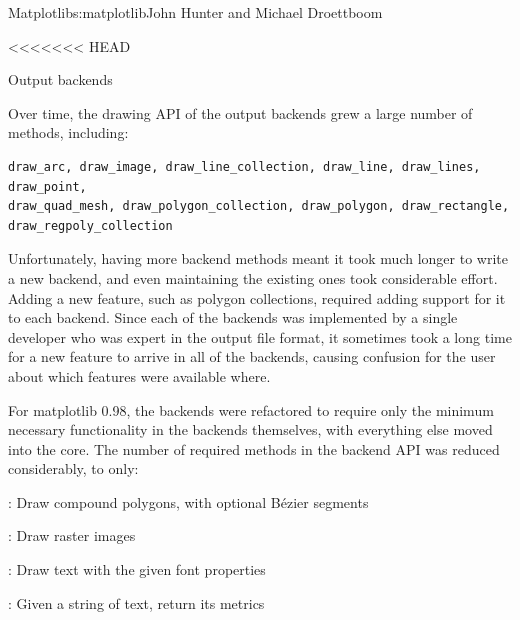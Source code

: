 \begin{aosachapter}{Matplotlib}{s:matplotlib}{John Hunter and Michael Droettboom}


<<<<<<< HEAD
\begin{aosasect1}{Output backends}


Over time, the drawing API of the output backends grew a large number
of methods, including:

\begin{verbatim}
draw_arc, draw_image, draw_line_collection, draw_line, draw_lines, draw_point,
draw_quad_mesh, draw_polygon_collection, draw_polygon, draw_rectangle,
draw_regpoly_collection
\end{verbatim}

Unfortunately, having more backend methods meant it took much longer
to write a new backend, and even maintaining the existing ones took
considerable effort.  Adding a new feature, such as polygon
collections, required adding support for it to each backend.  Since
each of the backends was implemented by a single developer who was
expert in the output file format, it sometimes took a long time for a
new feature to arrive in all of the backends, causing confusion for
the user about which features were available where.

For matplotlib 0.98, the backends were refactored to require only the
minimum necessary functionality in the backends themselves, with
everything else moved into the core.  The number of required methods
in the backend API was reduced considerably, to only:

\begin{aosaitemize}

  \item {}: Draw compound polygons, with optional
    B\'ezier segments

  \item {}: Draw raster images

  \item {}: Draw text with the given font properties

  \item {}: Given a string of
    text, return its metrics


\end{aosaitemize}
\end{aosasect1}
\end{aosachapter}
